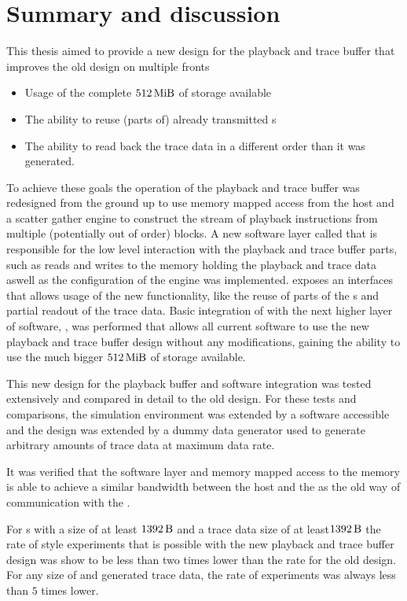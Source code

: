 \section{Summary and discussion}
This thesis aimed to provide a new design for the playback and trace buffer that improves the old design on multiple fronts
\begin{itemize}
\item Usage of the complete $\SI{512}{\mebi\byte}$ of storage available
\item The ability to reuse (parts of) already transmitted \PlaybackProgram{}s
\item The ability to read back the trace data in a different order than it was generated.
\end{itemize}
To achieve these goals the operation of the playback and trace buffer was redesigned from the ground up to use memory mapped access from the host and a scatter gather \DMA{} engine to construct the stream of playback instructions from multiple (potentially out of order) blocks. A new software layer called \ayo{} that is responsible for the low level interaction with the playback and trace buffer parts, such as reads and writes to the \DDR{} memory holding the playback and trace data aswell as the configuration of the \DMA{} engine was implemented. \ayo{} exposes an interfaces that allows usage of the new functionality, like the reuse of parts of the \PlaybackProgram{}s and partial readout of the trace data. Basic integration of \ayo{} with the next higher layer of software, \hxcomm{},  was performed that allows all current software to use the new playback and trace buffer design without any modifications, gaining the ability to use the much bigger $\SI{512}{\mebi\byte}$ of storage available.

This new design for the playback buffer and software integration was tested extensively and compared in detail to the old design. For these tests and comparisons, the simulation environment was extended by a software accessible \AXI{} \DRAM{} and the \FPGA{} design was extended by a dummy data generator used to generate arbitrary amounts of trace data at maximum data rate.

It was verified that the software layer and memory mapped access to the \DDR{} memory is able to achieve a similar bandwidth between the host and the \FPGA{} as the old way of communication with the \FPGA{}.


For \PlaybackProgram{}s with a size of at least $\SI{1392}{\byte}$ and a trace data size of at least$\SI{1392}{\byte}$ the rate of \HWinTheLoop{} style experiments that is possible with the new playback and trace buffer design was show to be less than two times lower than the rate for the old design. For any size of \PlaybackProgram{} and generated trace data, the rate of experiments was always less than $5$ times lower.

